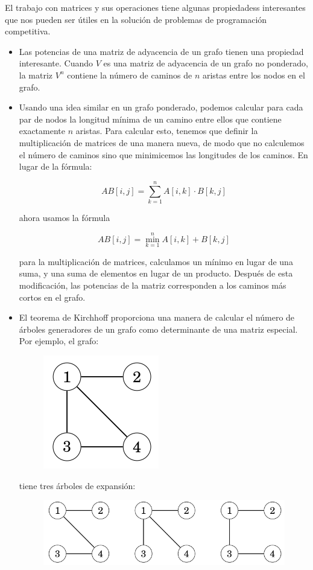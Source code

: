 El trabajo con matrices y sus operaciones tiene algunas propiedadess interesantes que nos pueden ser útiles en la solución de problemas de programación competitiva.

\begin{itemize}
	\item Las potencias de una matriz de adyacencia de un grafo tienen una propiedad interesante. Cuando $V$ es una matriz de adyacencia de un grafo no ponderado, la matriz $V^{n}$ contiene la
	número de caminos de $n$ aristas entre los nodos en el grafo.
	\item Usando una idea similar en un grafo ponderado, podemos calcular para cada par de nodos la longitud mínima de un camino entre ellos que contiene exactamente $n$ aristas. Para calcular esto, tenemos que definir la multiplicación de matrices de una manera nueva, de modo que no calculemos el número de caminos sino que minimicemos las longitudes de los caminos. En lugar de la fórmula:
	
	$$  AB[i,j] = \sum_{k=1}^{n}A[i,k]\cdot B[k,j] $$
	
	ahora usamos la fórmula
	
	$$  AB[i,j] = \min_{k=1}^{n}A[i,k] + B[k,j] $$
	
	para la multiplicación de matrices, calculamos un mínimo en lugar de una suma, y una suma de elementos en lugar de un producto. Después de esta modificación, las potencias de la matriz corresponden a los caminos más cortos en el grafo.
	
	\item El teorema de Kirchhoff proporciona una manera de calcular el número de árboles generadores de un grafo como determinante de una matriz especial. Por ejemplo, el grafo: 
	\begin{figure}[h!]
		\centering
		\includegraphics[width=0.15\linewidth]{img/graph_matrix_1}
		\label{fig:graphmatrix1}
	\end{figure}

	tiene tres árboles de expansión:
	
	\begin{figure}[h!]
		\centering
		\includegraphics[width=0.5\linewidth]{img/graph_matrix_2}
		\label{fig:graphmatrix2}
	\end{figure}


\end{itemize}
